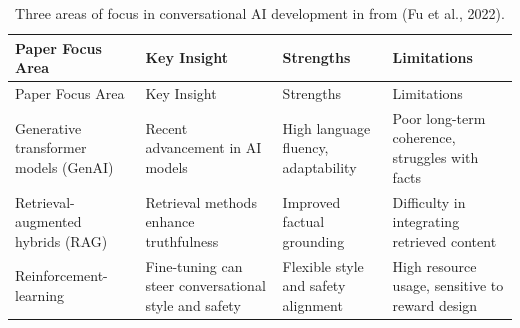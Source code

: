 \documentclass[
  letterpaper,
  DIV=11,
  numbers=noendperiod]{scrartcl}
\begin{document}
\begin{longtable}[]{@{}
  >{\raggedright\arraybackslash}p{}
  >{\raggedright\arraybackslash}p{}
  >{\raggedright\arraybackslash}p{}
  >{\raggedright\arraybackslash}p{}@{}}
\caption{Three areas of focus in conversational AI development in from
(Fu et al., 2022).}\tabularnewline
\toprule\noalign{}
\begin{minipage}[b]{\linewidth}\raggedright
Paper Focus Area
\end{minipage} & \begin{minipage}[b]{\linewidth}\raggedright
Key Insight
\end{minipage} & \begin{minipage}[b]{\linewidth}\raggedright
Strengths
\end{minipage} & \begin{minipage}[b]{\linewidth}\raggedright
Limitations
\end{minipage} \\
\midrule\noalign{}
\endfirsthead
\toprule\noalign{}
\begin{minipage}[b]{\linewidth}\raggedright
Paper Focus Area
\end{minipage} & \begin{minipage}[b]{\linewidth}\raggedright
Key Insight
\end{minipage} & \begin{minipage}[b]{\linewidth}\raggedright
Strengths
\end{minipage} & \begin{minipage}[b]{\linewidth}\raggedright
Limitations
\end{minipage} \\
\midrule\noalign{}
\endhead
\bottomrule\noalign{}
\endlastfoot
Generative transformer models (GenAI) & Recent advancement in AI models
& High language fluency, adaptability & Poor long-term coherence,
struggles with facts \\
Retrieval-augmented hybrids (RAG) & Retrieval methods enhance
truthfulness & Improved factual grounding & Difficulty in integrating
retrieved content \\
Reinforcement-learning & Fine-tuning can steer conversational style and
safety & Flexible style and safety alignment & High resource usage,
sensitive to reward design \\
\end{longtable}
\end{document}
